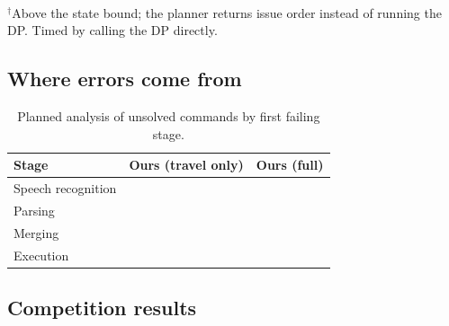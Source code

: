 \documentclass[conference]{IEEEtran}
\newcommand{\todo}[1]{}
\newcommand{\X}{}
\newcommand{\todo}[1]{\textcolor{red}{[TODO: #1]}}
\newcommand{\X}{\textcolor{red}{XX}}
\newcommand{\code}[1]{\texttt{#1}}
\begin{document}
\begin{table}[t]
\centering
\caption{Travel-only DP runtime on random batches (\code{bench\_runtime.py}).}
\label{tab:runtime}
\\[2pt]
{\footnotesize $^\dagger$Above the state bound; the planner returns issue order
instead of running the DP. Timed by calling the DP directly.}
\end{table}

\subsection{Where errors come from}
\begin{table}[t]
\centering
\caption{Planned analysis of unsolved commands by first failing stage.}
\label{tab:stages}
\small
\begin{tabular}{lcc}
\toprule
Stage & Ours (travel only) & Ours (full) \\
\midrule
Speech recognition & \X & \X \\
Parsing            & \X & \X \\
Merging            & \X & \X \\
Execution          & \X & \X \\
\bottomrule
\end{tabular}
\end{table}
\todo{Annotate failures by stage; include the known case where the parser drops
the first part of a command.}

\subsection{Competition results}
\todo{RoboCup 2027 GPSR runs: commands received, plans produced, points scored,
whether the bonus was awarded, and failures observed. Include a photo or
trajectory figure.}
\end{document}
